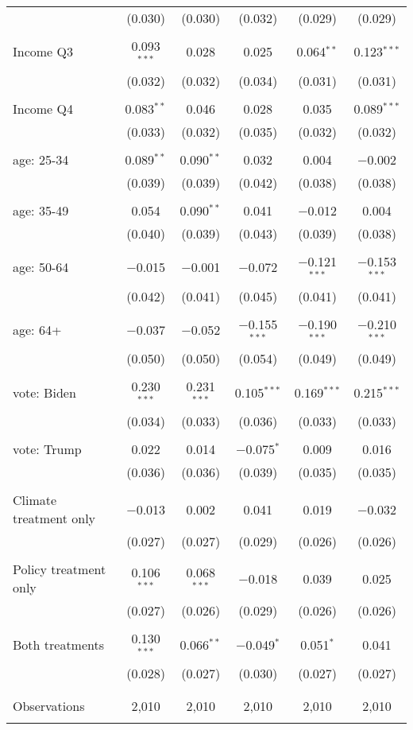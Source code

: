 \begin{tabular}{@{\extracolsep{5pt}}lccccc}
  & (0.030) & (0.030) & (0.032) & (0.029) & (0.029) \\ 
  & & & & & \\ 
 Income Q3 & 0.093$^{***}$ & 0.028 & 0.025 & 0.064$^{**}$ & 0.123$^{***}$ \\ 
  & (0.032) & (0.032) & (0.034) & (0.031) & (0.031) \\ 
  & & & & & \\ 
 Income Q4 & 0.083$^{**}$ & 0.046 & 0.028 & 0.035 & 0.089$^{***}$ \\ 
  & (0.033) & (0.032) & (0.035) & (0.032) & (0.032) \\ 
  & & & & & \\ 
 age: 25-34 & 0.089$^{**}$ & 0.090$^{**}$ & 0.032 & 0.004 & $-$0.002 \\ 
  & (0.039) & (0.039) & (0.042) & (0.038) & (0.038) \\ 
  & & & & & \\ 
 age: 35-49 & 0.054 & 0.090$^{**}$ & 0.041 & $-$0.012 & 0.004 \\ 
  & (0.040) & (0.039) & (0.043) & (0.039) & (0.038) \\ 
  & & & & & \\ 
 age: 50-64 & $-$0.015 & $-$0.001 & $-$0.072 & $-$0.121$^{***}$ & $-$0.153$^{***}$ \\ 
  & (0.042) & (0.041) & (0.045) & (0.041) & (0.041) \\ 
  & & & & & \\ 
 age: 64+ & $-$0.037 & $-$0.052 & $-$0.155$^{***}$ & $-$0.190$^{***}$ & $-$0.210$^{***}$ \\ 
  & (0.050) & (0.050) & (0.054) & (0.049) & (0.049) \\ 
  & & & & & \\ 
 vote: Biden & 0.230$^{***}$ & 0.231$^{***}$ & 0.105$^{***}$ & 0.169$^{***}$ & 0.215$^{***}$ \\ 
  & (0.034) & (0.033) & (0.036) & (0.033) & (0.033) \\ 
  & & & & & \\ 
 vote: Trump & 0.022 & 0.014 & $-$0.075$^{*}$ & 0.009 & 0.016 \\ 
  & (0.036) & (0.036) & (0.039) & (0.035) & (0.035) \\ 
  & & & & & \\ 
 Climate treatment only & $-$0.013 & 0.002 & 0.041 & 0.019 & $-$0.032 \\ 
  & (0.027) & (0.027) & (0.029) & (0.026) & (0.026) \\ 
  & & & & & \\ 
 Policy treatment only & 0.106$^{***}$ & 0.068$^{***}$ & $-$0.018 & 0.039 & 0.025 \\ 
  & (0.027) & (0.026) & (0.029) & (0.026) & (0.026) \\ 
  & & & & & \\ 
 Both treatments & 0.130$^{***}$ & 0.066$^{**}$ & $-$0.049$^{*}$ & 0.051$^{*}$ & 0.041 \\ 
  & (0.028) & (0.027) & (0.030) & (0.027) & (0.027) \\ 
  & & & & & \\ 
\hline \\[-1.8ex] 

Observations & 2,010 & 2,010 & 2,010 & 2,010 & 2,010 \\ 
\hline 
\hline \\[-1.8ex] 
\end{tabular} 
